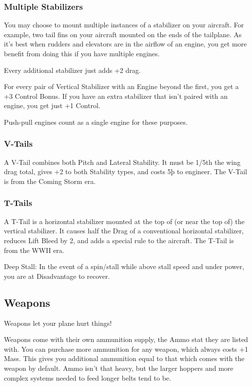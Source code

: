 \documentclass{article}
\begin{document}
\subsubsection{Multiple Stabilizers}
\label{_Multiple Stabilizers}

You may choose to mount multiple instances of a stabilizer on your
aircraft. For example, two tail fins on your aircraft mounted on the
ends of the tailplane. As it's best when rudders and elevators are in
the airflow of an engine, you get more benefit from doing this if you
have multiple engines.

Every additional stabilizer just adds +2 drag.

For every pair of Vertical Stabilizer with an Engine beyond the first,
you get a +3 Control Bonus. If you have an extra stabilizer that isn't
paired with an engine, you get just +1 Control.

Push-pull engines count as a single engine for these purposes.

\subsubsection{V-Tails}
\label{_V-Tails}

A V-Tail combines both Pitch and Lateral Stability. It must be 1/5th the
wing drag total, gives +2 to both Stability types, and costs 5þ to
engineer. The V-Tail is from the Coming Storm era.

\subsubsection{T-Tails}
\label{_T-Tails}

A T-Tail is a horizontal stabilizer mounted at the top of (or near the
top of) the vertical stabilizer. It causes half the Drag of a
conventional horizontal stabilizer, reduces Lift Bleed by 2, and adds a
special rule to the aircraft. The T-Tail is from the WWII era.

Deep Stall: In the event of a spin/stall while above stall speed and
under power, you are at Disadvantage to recover.

\subsection{Weapons}
\label{_Weapons}

Weapons let your plane hurt things!

Weapons come with their own ammunition supply, the Ammo stat they are
listed with. You can purchase more ammunition for any weapon, which
always costs +1 Mass. This gives you additional ammunition equal to that
which comes with the weapon by default. Ammo isn't that heavy, but the
larger hoppers and more complex systems needed to feed longer belts tend
to be.
\end{document}
